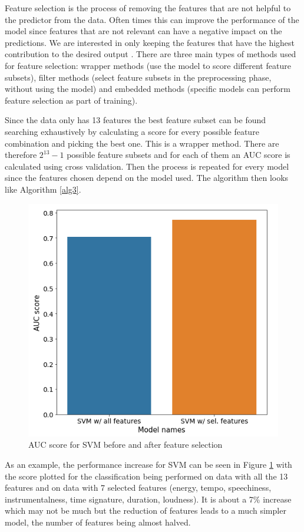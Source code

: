 Feature selection is the process of removing the features that are not helpful to the predictor from the data. Often times this can improve the performance of the model since features that are not relevant can have a negative impact on the predictions. We are interested in only keeping the features that have the highest contribution to the desired output \cite{FeatureSel:online} \cite{guyon2003introduction}. There are three main types of methods used for feature selection: wrapper methods (use the model to score different feature subsets), filter methods (select feature subsets in the preprocessing phase, without using the model) and embedded methods (specific models can perform feature selection as part of training). 

Since the data only has 13 features the best feature subset can be found searching exhaustively by calculating a score for every possible feature combination and picking the best one. This is a wrapper method. There are therefore \(2^{13} - 1\) possible feature subsets and for each of them an AUC score is calculated using cross validation. Then the process is repeated for every model since the features chosen depend on the model used. The algorithm then looks like Algorithm \ref{alg3}.

\begin{figure}[h]
\centering
\includegraphics[width=0.8\linewidth]{background/fig/fs1.PNG}
\caption{AUC score for SVM before and after feature selection}
\label{fig:fs1}
\end{figure}

As an example, the performance increase for SVM can be seen in Figure \ref{fig:fs1} with the score plotted for the classification being performed on data with all the 13 features and on data with 7 selected features (energy, tempo, speechiness, instrumentalness, time signature, duration, loudness). It is about a 7\% increase which may not be much but the reduction of features leads to a much simpler model, the number of features being almost halved.


